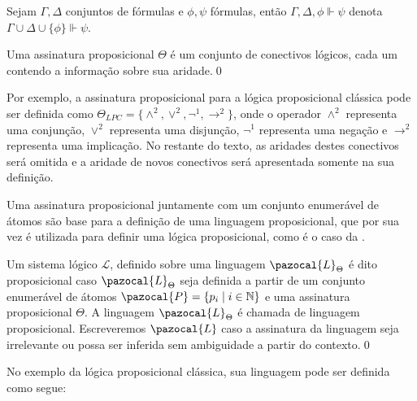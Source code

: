     \begin{notacao}
        Sejam $\Gamma, \Delta$ conjuntos de fórmulas e $\phi, \psi$ fórmulas, então $\Gamma, \Delta, \phi \Vdash \psi$ denota $\Gamma \cup \Delta \cup \{\phi\} \Vdash \psi$.
    \end{notacao}

    \begin{definicao}\label{def:ass_prop}
        Uma assinatura proposicional $\Theta$ é um conjunto de conectivos lógicos, cada um contendo a informação sobre sua aridade.\qed{}
    \end{definicao}
    Por exemplo, a assinatura proposicional para a lógica proposicional clássica pode ser definida como $\Theta_{LPC} = \{\land^{2}, \lor^{2}, \neg^{1}, \to^{2}\}$, onde o operador $\land^{2}$ representa uma conjunção, $\lor^{2}$ representa uma disjunção, $\neg^{1}$ representa uma negação e $\to^{2}$ representa uma implicação. No restante do texto, as aridades destes conectivos será omitida e a aridade de novos conectivos será apresentada somente na sua definição.

    Uma assinatura proposicional juntamente com um conjunto enumerável de átomos são base para a definição de uma linguagem proposicional, que por sua vez é utilizada para definir uma lógica proposicional, como é o caso da \lfium{}.

    \begin{definicao}\label{def:proposicional}
        Um sistema lógico $\mathcal{L}$, definido sobre uma linguagem $\pazocal{L}_{\Theta}$ é dito proposicional caso $\pazocal{L}_{\Theta}$ seja definida a partir de um conjunto enumerável de átomos $\pazocal{P} = \{p_{i} \;| \; i \in \mathbb{N} \}$ e uma assinatura proposicional $\Theta$. A linguagem $\pazocal{L}_{\Theta}$ é chamada de linguagem proposicional. Escreveremos $\pazocal{L}$ caso a assinatura da linguagem seja irrelevante ou possa ser inferida sem ambiguidade a partir do contexto.\qed{}%
    \end{definicao}

    No exemplo da lógica proposicional clássica, sua linguagem pode ser definida como segue:

